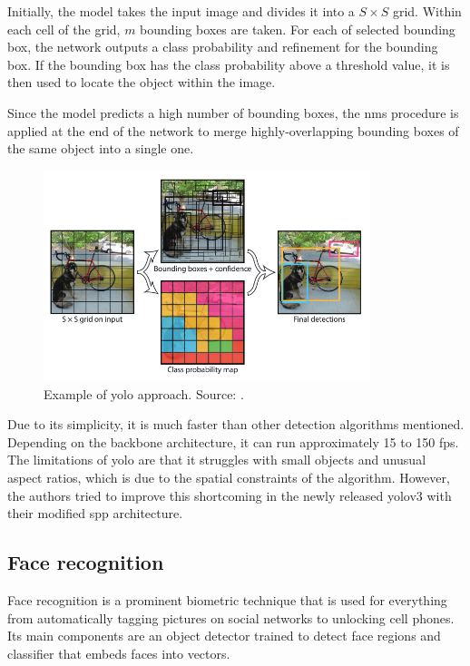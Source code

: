             Initially, the model takes the input image and divides it into a $S \times S$ grid. Within each cell of the grid, $m$ bounding boxes are taken. For each of selected bounding box, the network outputs a class probability and refinement for the bounding box. If the bounding box has the class probability above a threshold value, it is then used to locate the object within the image. 
            
            Since the model predicts a high number of bounding boxes, the \gls{nms} \cite{rosebrocknms} procedure is applied at the end of the network to merge highly-overlapping bounding boxes of the same object into a single one.
            
             \begin{figure}[ht]
                \centering
                \includegraphics[width=0.85\textwidth]{resources/yolo_approach.png}
                \caption{Example of \gls{yolo} approach. Source: \cite{redmon2016you}.}
                \label{fig:yolo approach}
            \end{figure}
            
            Due to its simplicity, it is much faster than other detection algorithms mentioned. Depending on the backbone architecture, it can run approximately 15 to 150 \gls{fps}. The limitations of \gls{yolo} are that it struggles with small objects and unusual aspect ratios, which is due to the spatial constraints of the algorithm. However, the authors tried to improve this shortcoming in the newly released \gls{yolo}v3 with their modified \gls{spp} architecture.

    \subsection{Face recognition}
        Face recognition \cite{wang2018deep} is a prominent biometric technique that is used for everything from automatically tagging pictures on social networks to unlocking cell phones. Its main components are an object detector trained to detect face regions and classifier that embeds faces into vectors.
        
